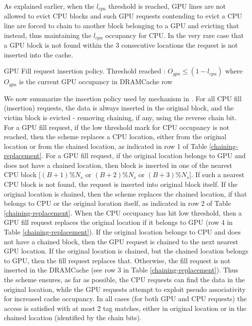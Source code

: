 \par As explained earlier, when the \textit{$l_{cpu}$} threshold is reached, GPU lines are not allowed to evict CPU blocks and such GPU requests contending to evict a CPU line are forced to chain to another block belonging to a GPU and evicting that instead, thus maintaining the \textit{$l_{cpu}$} occupancy for CPU. In the very rare case that a GPU block is not found within the 3 consecutive locations the request is not inserted into the cache.

\begin{table}[htb]
\centering
\small

\caption{GPU Fill request insertion policy. Threshold reached : $O_{gpu}\le(1-l_{cpu})$ where $O_{gpu}$ is the current GPU occupancy in DRAMCache row}
\label{chaining-replacement}
\end{table}

\par We now summarize the insertion policy used by \chaining mechanism in \cachename. For all CPU fill (insertion) requests, the data is always inserted in the original block, and the victim block is evicted - removing chaining, if any, using the reverse chain bit. For a GPU fill request, if the low threshold mark for CPU occupancy is not reached, then the \chaining scheme replaces a CPU location, either from the original location or from the chained location, as indicated in row 1 of Table \ref{chaining-replacement}. For a GPU fill request, if the original location belongs to GPU and does not have a chained location, then block is inserted in one of the nearest CPU block [$(B+1)\%N_s$ or $(B+2)\%N_s$ or $(B+3)\%N_s$]. If such a nearest CPU block is not found, the request is inserted into original block itself. If the original location is chained, then the scheme replaces the chained location, if that belongs to CPU or the original location itself, as indicated in row 2 of Table \ref{chaining-replacement}. When the CPU occupancy has hit low threshold, then a GPU fill request replaces the original location if it belongs to GPU (row 4 in Table \ref{chaining-replacement}). If the original location belongs to CPU and does not have a chained block, then the GPU request is chained to the next nearest GPU location. If the original location is chained, but the chained location belongs to GPU, then the fill request replaces that. Otherwise, the fill request is not inserted in the DRAMCache (see row 3 in Table \ref{chaining-replacement}). Thus the \chaining scheme ensures, as far as possible, the CPU requests can find the data in the original location, while the GPU requests attempt to exploit pseudo associativity for increased cache occupancy. In all cases (for both GPU and CPU requests) the access is satisfied with at most 2 tag matches, either in original location or in the chained location (identified by the chain bits). 

